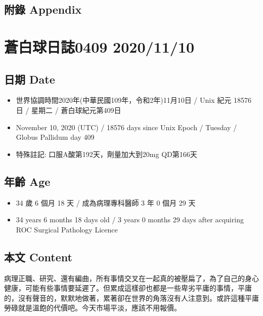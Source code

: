 \documentclass[
]{article}
\providecommand{\tightlist}{%
  \setlength{\itemsep}{0pt}\setlength{\parskip}{0pt}}
\begin{document}
\hypertarget{ux9644ux9304-appendix-64}{%
\subsection{附錄 Appendix}\label{ux9644ux9304-appendix-64}}

\hypertarget{ux84bcux767dux7403ux65e5ux8a8c0409-20201110}{%
\section{蒼白球日誌0409
2020/11/10}\label{ux84bcux767dux7403ux65e5ux8a8c0409-20201110}}

\hypertarget{ux65e5ux671f-date-65}{%
\subsection{日期 Date}\label{ux65e5ux671f-date-65}}

\begin{itemize}
\tightlist
\item
  世界協調時間2020年(中華民國109年，令和2年)11月10日 / Unix 紀元 18576
  日 / 星期二 / 蒼白球紀元第409日
\item
  November 10, 2020 (UTC) / 18576 days since Unix Epoch / Tuesday /
  Globus Pallidum day 409
\item
  特殊註記: 口服A酸第192天，劑量加大到20mg QD第166天
\end{itemize}

\hypertarget{ux5e74ux9f61-age-65}{%
\subsection{年齡 Age}\label{ux5e74ux9f61-age-65}}

\begin{itemize}
\tightlist
\item
  34 歲 6 個月 18 天 / 成為病理專科醫師 3 年 0 個月 29 天
\item
  34 years 6 months 18 days old / 3 years 0 months 29 days after
  acquiring ROC Surgical Pathology Licence
\end{itemize}

\hypertarget{ux672cux6587-content-65}{%
\subsection{本文 Content}\label{ux672cux6587-content-65}}

病理正職、研究、還有編曲，所有事情交叉在一起真的被壓扁了，為了自己的身心健康，可能有些事情要延遲了。但累成這樣卻也都是一些卑劣平庸的事情，平庸的，沒有聲音的，默默地做著，累著卻在世界的角落沒有人注意到。或許這種平庸勞碌就是溫飽的代價吧。今天市場平淡，應該不用報價。
\end{document}

